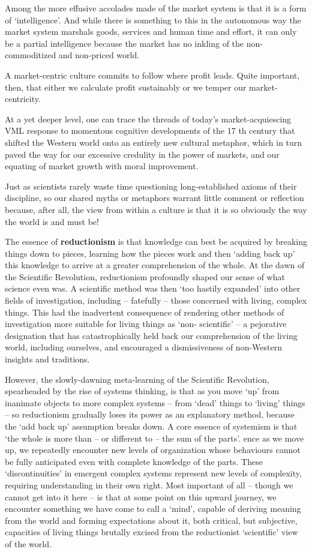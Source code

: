 \documentclass[
]{book}
\begin{document}
Among the more effusive accolades made of the market system is that it is a form of `intelligence'.
And while there is something to this in the autonomous way the market system marshals goods,
services and human time and effort, it can only be a partial intelligence because the market has no
inkling of the non-commoditized and non-priced world.

A market-centric culture commits to follow where profit leads. Quite important, then, that either we
calculate profit sustainably or we temper our market-centricity.

At a yet deeper level, one can trace the threads of today's market-acquiescing VML response to
momentous cognitive developments of the 17 th century that shifted the Western world onto an
entirely new cultural metaphor, which in turn paved the way for our excessive credulity in the power
of markets, and our equating of market growth with moral improvement.

Just as scientists rarely waste time questioning long-established axioms of their
discipline, so our shared myths or metaphors warrant little comment or reflection because, after all,
the view from within a culture is that it is so obviously the way the world is and must be!

The essence of \textbf{reductionism} is that knowledge can best be acquired by
breaking things down to pieces, learning how the pieces work and then `adding back up' this
knowledge to arrive at a greater comprehension of the whole.
At the dawn of the Scientific Revolution, reductionism profoundly shaped our sense of what science
even was.
A scientific method was then `too hastily expanded' into other fields of investigation,
including -- fatefully -- those concerned with living, complex things. This had the inadvertent
consequence of rendering other methods of investigation more suitable for living things as `non-
scientific' -- a pejorative designation that has catastrophically held back our comprehension of the
living world, including ourselves, and encouraged a dismissiveness of non-Western insights and
traditions.

However, the slowly-dawning meta-learning of the Scientific Revolution, spearheaded by the rise of
systems thinking, is that as you move `up' from inanimate objects to more complex systems -- from
`dead' things to `living' things -- so reductionism gradually loses its power as an explanatory method,
because the `add back up' assumption breaks down. A core essence of systemism is that `the whole is
more than -- or different to -- the sum of the parts'.
ence as we move up, we repeatedly encounter
new levels of organization whose behaviours cannot be fully anticipated even with complete
knowledge of the parts. These `discontinuities' in emergent complex systems represent new levels of
complexity, requiring understanding in their own right. Most important of all -- though we cannot get
into it here -- is that at some point on this upward journey, we encounter something we have come to
call a `mind', capable of deriving meaning from the world and forming expectations about it, both
critical, but subjective, capacities of living things brutally excised from the reductionist `scientific'
view of the world.
\end{document}
